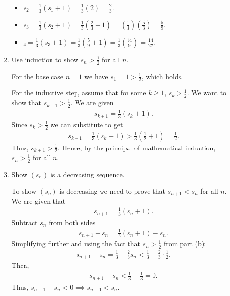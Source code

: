 \documentclass [10pt]{article}
\newcommand{\jg}[1]{{\color{blue} #1}}
\begin{document}
\begin{enumerate}
\begin{enumerate}
\jg{
\begin{itemize}
    \item $s_2 = \frac{1}{3}(s_1 + 1) = \frac{1}{3}(2) = \frac{2}{3}$. 
    \item $s_3 = \frac{1}{3} (s_2 + 1) = \frac{1}{3} (\frac{2}{3} + 1) = (\frac{1}{3}) (\frac{5}{3}) = \frac{5}{9}$. 
    \item $_4 = \frac{1}{3}(s_3 + 1) = \frac{1}{3} (\frac{5}{9} + 1) = \frac{1}{3} (\frac{14}{9}) = \frac{14}{27}$.
\end{itemize}
}

\item Use induction to show $s_n > \frac{1}{2}$ for all $n$.

\jg{
For the base case $n=1$ we have $s_1 = 1 > \frac{1}{2}$, which holds. 

For the inductive step, assume that for some $k \geq 1$, $s_k > \frac{1}{2}$. We want to show that $s_{k+1} > \frac{1}{2}$. We are given 
\begin{align*}
    s_{k+1} = \frac{1}{3} (s_k + 1). 
\end{align*}
Since $s_k > \frac{1}{2}$ we can substitute to get 
\begin{align*}
    s_{k+1} = \frac{1}{3} (s_k + 1) > \frac{1}{3}(\frac{1}{2} + 1) = \frac{1}{2}. 
\end{align*}
Thus, $s_{k+1} > \frac{1}{2}$. Hence, by the principal of mathematical induction, $s_n > \frac{1}{2}$ for all $n$. 
}

\item Show $(s_n)$ is a decreasing sequence.

\jg{
To show $(s_n)$ is decreasing we need to prove that $s_{n+1} < s_n$ for all $n$. We are given that 
\begin{align*}
    s_{n+1} = \frac{1}{3} (s_n + 1). 
\end{align*}
Subtract $s_n$ from both sides
\begin{align*}
    s_{n+1} - s_n = \frac{1}{3} (s_n + 1) - s_n.
\end{align*}
Simplifying further and using the fact that $s_n > \frac{1}{2}$ from part (b): 
\begin{align*}
    s_{n+1} - s_n = \frac{1}{3} - \frac{2}{3} s_n < \frac{1}{3} - \frac{2}{3} \cdot \frac{1}{2}. 
\end{align*}
Then, 
\begin{align*}
    s_{n+1} - s_n < \frac{1}{3} - \frac{1}{3} = 0. 
\end{align*}
Thus, $s_{n+1} - s_n < 0 \implies s_{n+1} < s_n$. 

}
\end{enumerate}
\end{enumerate}
\end{document}
